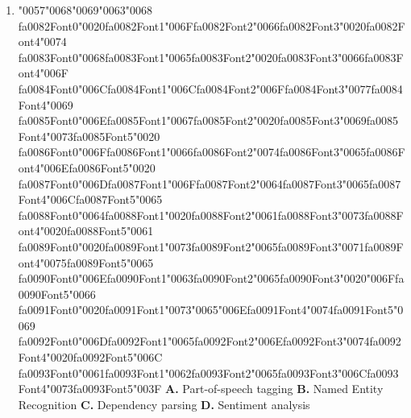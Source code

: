 \documentclass[11pt]{article}
\begin{document}
\begin{enumerate}[leftmargin=*]
  \item {\char"0057}{\char"0068}{\char"0069}{\char"0063}{\char"0068} {\csname fa0082Font0\endcsname\char"0020}{\csname fa0082Font1\endcsname\char"006F}{\csname fa0082Font2\endcsname\char"0066}{\csname fa0082Font3\endcsname\char"0020}{\csname fa0082Font4\endcsname\char"0074} {\csname fa0083Font0\endcsname\char"0068}{\csname fa0083Font1\endcsname\char"0065}{\csname fa0083Font2\endcsname\char"0020}{\csname fa0083Font3\endcsname\char"0066}{\csname fa0083Font4\endcsname\char"006F} {\csname fa0084Font0\endcsname\char"006C}{\csname fa0084Font1\endcsname\char"006C}{\csname fa0084Font2\endcsname\char"006F}{\csname fa0084Font3\endcsname\char"0077}{\csname fa0084Font4\endcsname\char"0069} {\csname fa0085Font0\endcsname\char"006E}{\csname fa0085Font1\endcsname\char"0067}{\csname fa0085Font2\endcsname\char"0020}{\csname fa0085Font3\endcsname\char"0069}{\csname fa0085Font4\endcsname\char"0073}{\csname fa0085Font5\endcsname\char"0020} {\csname fa0086Font0\endcsname\char"006F}{\csname fa0086Font1\endcsname\char"0066}{\csname fa0086Font2\endcsname\char"0074}{\csname fa0086Font3\endcsname\char"0065}{\csname fa0086Font4\endcsname\char"006E}{\csname fa0086Font5\endcsname\char"0020} {\csname fa0087Font0\endcsname\char"006D}{\csname fa0087Font1\endcsname\char"006F}{\csname fa0087Font2\endcsname\char"0064}{\csname fa0087Font3\endcsname\char"0065}{\csname fa0087Font4\endcsname\char"006C}{\csname fa0087Font5\endcsname\char"0065} {\csname fa0088Font0\endcsname\char"0064}{\csname fa0088Font1\endcsname\char"0020}{\csname fa0088Font2\endcsname\char"0061}{\csname fa0088Font3\endcsname\char"0073}{\csname fa0088Font4\endcsname\char"0020}{\csname fa0088Font5\endcsname\char"0061} {\csname fa0089Font0\endcsname\char"0020}{\csname fa0089Font1\endcsname\char"0073}{\csname fa0089Font2\endcsname\char"0065}{\csname fa0089Font3\endcsname\char"0071}{\csname fa0089Font4\endcsname\char"0075}{\csname fa0089Font5\endcsname\char"0065} {\csname fa0090Font0\endcsname\char"006E}{\csname fa0090Font1\endcsname\char"0063}{\csname fa0090Font2\endcsname\char"0065}{\csname fa0090Font3\endcsname\char"0020}{\char"006F}{\csname fa0090Font5\endcsname\char"0066} {\csname fa0091Font0\endcsname\char"0020}{\csname fa0091Font1\endcsname\char"0073}{\char"0065}{\char"006E}{\csname fa0091Font4\endcsname\char"0074}{\csname fa0091Font5\endcsname\char"0069} {\csname fa0092Font0\endcsname\char"006D}{\csname fa0092Font1\endcsname\char"0065}{\csname fa0092Font2\endcsname\char"006E}{\csname fa0092Font3\endcsname\char"0074}{\csname fa0092Font4\endcsname\char"0020}{\csname fa0092Font5\endcsname\char"006C} {\csname fa0093Font0\endcsname\char"0061}{\csname fa0093Font1\endcsname\char"0062}{\csname fa0093Font2\endcsname\char"0065}{\csname fa0093Font3\endcsname\char"006C}{\csname fa0093Font4\endcsname\char"0073}{\csname fa0093Font5\endcsname\char"003F}
    \textbf{A.} Part-of-speech tagging
    \textbf{B.} Named Entity Recognition
    \textbf{C.} Dependency parsing
    \textbf{D.} Sentiment analysis


\end{enumerate}
\end{document}
